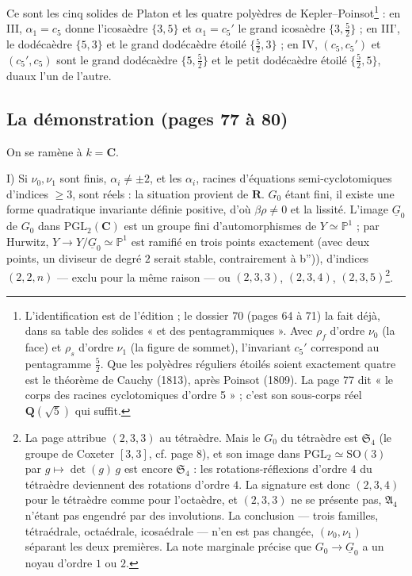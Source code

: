 \documentclass[11pt,a4paper]{article}
\begin{document}
Ce sont les cinq solides de Platon et les quatre polyèdres de
Kepler--Poinsot\footnote{L'identification est de l'édition ; le dossier 70
(pages 64 à 71) la fait déjà, dans sa table des solides « et des
pentagrammiques ». Avec $\rho_f$ d'ordre $\nu_0$ (la face) et $\rho_s$ d'ordre
$\nu_1$ (la figure de sommet), l'invariant $c_5'$ correspond au pentagramme
$\frac52$. Que les polyèdres réguliers étoilés soient exactement quatre est le
théorème de Cauchy (1813), après Poinsot (1809). La page 77 dit « le corps des
racines cyclotomiques d'ordre 5 » ; c'est son sous-corps réel
$\mathbf{Q}(\sqrt5)$ qui suffit.} : en III, $\alpha_1 = c_5$ donne l'icosaèdre
$\{3, 5\}$ et $\alpha_1 = c_5'$ le grand icosaèdre $\{3, \frac52\}$ ; en III',
le dodécaèdre $\{5, 3\}$ et le grand dodécaèdre étoilé $\{\frac52, 3\}$ ; en
IV, $(c_5, c_5')$ et $(c_5', c_5)$ sont le grand dodécaèdre $\{5, \frac52\}$ et
le petit dodécaèdre étoilé $\{\frac52, 5\}$, duaux l'un de l'autre.

\subsection*{La démonstration (pages 77 à 80)}

On se ramène à $k = \mathbf{C}$.

I) Si $\nu_0, \nu_1$ sont finis, $\alpha_i \neq \pm 2$, et les $\alpha_i$,
racines d'équations semi-cyclotomiques d'indices $\geq 3$, sont réels : la
situation provient de $\mathbf{R}$. $G_0$ étant fini, il existe une forme
quadratique invariante définie positive, d'où $\beta\rho \neq 0$ et la
lissité. L'image $\underline{G}_0$ de $G_0$ dans $\mathrm{PGL}_2(\mathbf{C})$
est un groupe fini d'automorphismes de $Y \simeq \mathbb{P}^1$ ; par Hurwitz,
$Y \to Y/\underline{G}_0 \simeq \mathbb{P}^1$ est ramifié en trois points
exactement (avec deux points, un diviseur de degré $2$ serait stable,
contrairement à b'')), d'indices $(2, 2, n)$ --- exclu pour la même raison ---
ou $(2, 3, 3)$, $(2, 3, 4)$, $(2, 3, 5)$\footnote{La page attribue $(2, 3, 3)$
au tétraèdre. Mais le $G_0$ du tétraèdre est $\mathfrak{S}_4$ (le groupe de
Coxeter $[3, 3]$, cf. page 8), et son image dans $\mathrm{PGL}_2 \simeq
\mathrm{SO}(3)$ par $g \mapsto \det(g)\, g$ est encore $\mathfrak{S}_4$ : les
rotations-réflexions d'ordre $4$ du tétraèdre deviennent des rotations d'ordre
$4$. La signature est donc $(2, 3, 4)$ pour le tétraèdre comme pour
l'octaèdre, et $(2, 3, 3)$ ne se présente pas, $\mathfrak{A}_4$ n'étant pas
engendré par des involutions. La conclusion --- trois familles, tétraédrale,
octaédrale, icosaédrale --- n'en est pas changée, $(\nu_0, \nu_1)$ séparant
les deux premières. La note marginale précise que $G_0 \to \underline{G}_0$ a un
noyau d'ordre $1$ ou $2$.}.
\end{document}
